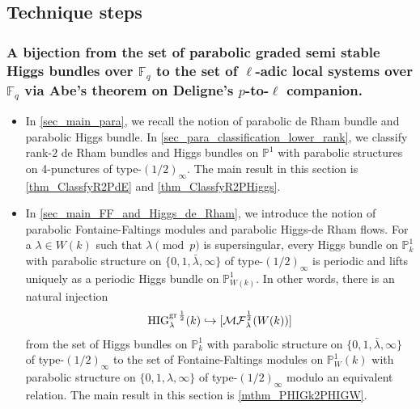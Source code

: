 \documentclass[12pt,twoside]{book}
\theoremstyle{plain}
\theoremstyle{definition}
\theoremstyle{remark}
\newcommand{\MF}{\mathcal{MF}}
\numberwithin{equation}{section}
\def\High{{\mathrm{HIG}^{{\rm gr}\,{1\over 2}}_{\lambda}}}
\def\MFh{\MF^{{1\over 2}}_{\lambda}}
\begin{document}
\subsection{Technique steps}

\subsubsection{\bf A bijection from the set of parabolic graded semi stable Higgs bundles over $\mathbb F_q$ to the set of $\ell$-adic local systems over $\mathbb F_q$ via Abe's theorem on Deligne's $p$-to-$\ell$ companion.}

\begin{itemize}
\item In \autoref{sec_main_para}, we recall the notion of parabolic de Rham bundle and parabolic Higgs bundle. In \autoref{sec_para_classification_lower_rank}, we classify rank-$2$ de Rham bundles and Higgs bundles on $\mathbb P^1$ with parabolic structures on 4-punctures of type-$(1/2)_\infty$. The main result in this section is \autoref{thm_ClassfyR2PdE} and \autoref{thm_ClassfyR2PHiggs}.

\item In \autoref{sec_main_FF_and_Higgs_de_Rham}, we introduce the notion of parabolic Fontaine-Faltings modules and parabolic Higgs-de Rham flows. For a $\lambda\in W(k)$ such that $\lambda\pmod{p}$ is supersingular, every Higgs bundle on $\mathbb P^1_k$ with parabolic structure on $\{0,1,\bar\lambda,\infty\}$ of type-$(1/2)_\infty$ is periodic and lifts uniquely as a periodic Higgs bundle on $\mathbb P^1_{W(k)}$. In other words, there is an natural injection 
\[\High(k) \hookrightarrow [\MFh(W(k))]\]
from the set of Higgs bundles on $\mathbb P^1_k$ with parabolic structure on $\{0,1,\bar\lambda,\infty\}$ of type-$(1/2)_\infty$ 
to the set of Fontaine-Faltings modules on $\mathbb P^1_W(k)$ with parabolic structure on $\{0,1, \lambda,\infty\}
$ of type-$(1/2)_\infty$ modulo an equivalent relation. The main result in this section is \autoref{mthm_PHIGk2PHIGW}.


\end{itemize}
\end{document}
